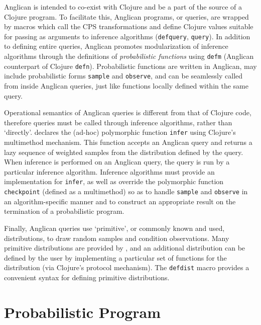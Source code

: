 \documentclass[preprint]{sigplanconf}
\begin{document}
Anglican is intended to co-exist with Clojure and be a part of
the source of a Clojure program. To facilitate this, Anglican
programs, or queries, are wrapped by macros\iftoggle{full}{ (defined in the
\texttt{anglican.emit} namespace)}{} which call the CPS
transformations and define Clojure values suitable for passing
as arguments to inference algorithms (\texttt{defquery},
\texttt{query}). In addition to defining entire queries,
Anglican promotes modularization of inference algorithms through
the definitions of \textit{probabilistic functions} using
\texttt{defm} (Anglican counterpart of Clojure \texttt{defn}).
Probabilistic functions are
written in Anglican, may include probabilistic forms
\texttt{sample} and \texttt{observe}, and can be seamlessly
called from inside Anglican queries, just like functions locally
defined within the same query.

Operational semantics of Anglican queries is different from that
of Clojure code, therefore queries must be called through
inference algorithms, rather than `directly'. \iftoggle{full}{The
\texttt{anglican.inference} namespace}{Anglican} declares the (ad-hoc) polymorphic
function \texttt{infer} using Clojure's multimethod mechanism.
This function accepts an Anglican query and
returns a lazy sequence of weighted samples from the
distribution defined by the query.  When inference
is performed on an Anglican query, the query is run by a
particular inference algorithm. Inference algorithms must
provide an implementation for \texttt{infer}, as well as
override the polymorphic function \texttt{checkpoint} (defined
as a multimethod) so as to handle \texttt{sample} and
\texttt{observe} in an algorithm-specific manner and
to construct an appropriate result on the
termination of a probabilistic program.

Finally, Anglican queries use `primitive', or commonly known and
used, distributions, to draw random samples and condition
observations. Many primitive distributions are provided by
\iftoggle{full}{the \texttt{anglican.runtime} namespace}{the
runtime}, and an additional distribution can be defined by the
user by implementing a particular set of functions for the
distribution (via Clojure's protocol mechanism). The
\texttt{defdist} macro provides a convenient syntax for defining
primitive distributions.

\section{Probabilistic Program}
\label{sec:pp-def}
\end{document}
